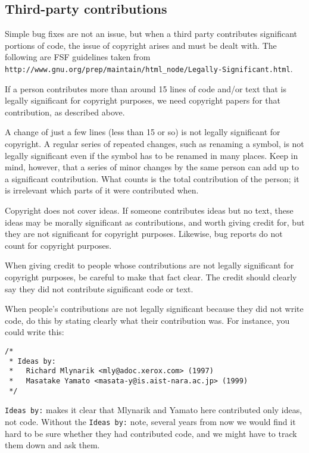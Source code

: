 \subsection{Third-party contributions}\label{section:significantChanges}

Simple bug fixes are not an issue, but when a third party contributes significant portions of code, the issue of copyright arises and must be dealt with. The following are FSF guidelines taken from 
{\tt http://www.gnu.org/prep/maintain/html\_node/Legally-Significant.html}.

If a person contributes more than around 15 lines of code and/or text that is legally significant for copyright purposes, we need copyright papers for that contribution, as described above.
 
A change of just a few lines (less than 15 or so) is not legally significant for copyright. A regular series of repeated changes, such as renaming a symbol, is not legally significant even if the symbol has to be renamed in many places. Keep in mind, however, that a series of minor changes by the same person can add up to a significant contribution. What counts is the total contribution of the person; it is irrelevant which parts of it were contributed when.
 
Copyright does not cover ideas. If someone contributes ideas but no text, these ideas may be morally significant as contributions, and worth giving credit for, but they are not significant for copyright purposes. Likewise, bug reports do not count for copyright purposes.
 
When giving credit to people whose contributions are not legally significant for copyright purposes, be careful to make that fact clear. The credit should clearly say they did not contribute significant code or text.
 
When people’s contributions are not legally significant because they did not write code, do this by stating clearly what their contribution was. For instance, you could write this:
 
\begin{verbatim}
/*
 * Ideas by:
 *   Richard Mlynarik <mly@adoc.xerox.com> (1997)
 *   Masatake Yamato <masata-y@is.aist-nara.ac.jp> (1999)
 */
\end{verbatim}

{\tt Ideas by:} makes it clear that Mlynarik and Yamato here contributed only ideas, not code. 
Without the {\tt Ideas by:} note, several years from now we would find it hard to be sure whether they had contributed code, and we might have to track them down and ask them.
 
